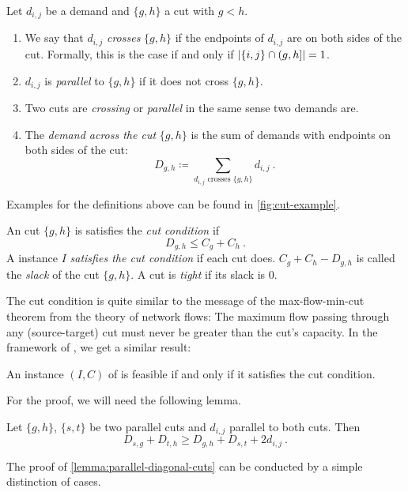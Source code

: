 \begin{definition}
	Let $d_{i, j}$ be a demand and $\{g, h\}$ a cut with $g < h$.
	\begin{enumerate}
		\item We say that $d_{i, j}$ \emph{crosses} $\{g, h\}$ if the endpoints of $d_{i, j}$ are on both sides of the cut.
		Formally, this is the case if and only if $\abs{\{i, j\} \cap (g, h]} = 1$.
		\item $d_{i, j}$ is \emph{parallel} to $\{g, h\}$ if it does not cross $\{g, h\}$.
		\item Two cuts are \emph{crossing} or \emph{parallel} in the same sense two demands are.
		\item The \emph{demand across the cut} $\{g, h\}$ is the sum of demands with endpoints on both sides of the cut:
		\begin{equation}
			\label{eq:cut-demand-definition}
			D_{g,h} \coloneqq \sum_{d_{i,j} \text{ crosses } \{g, h\} } d_{i, j}\ .
		\end{equation}
	\end{enumerate}
\end{definition}



Examples for the definitions above can be found in \cref{fig:cut-example}.

\begin{definition}
	An cut $\{g, h\}$ is satisfies the \emph{cut condition} if
	\begin{equation}
		D_{g,h} \leq C_g + C_h \ .
	\end{equation}
	A \RRLWC instance $I$ \emph{satisfies the cut condition} if each cut does.
	$C_g + C_h - D_{g,h}$ is called the \emph{slack} of the cut $\{g, h\}$.
	A cut is \emph{tight} if its slack is $0$.
\end{definition}

The cut condition is quite similar to the message of the max-flow-min-cut theorem from the theory of network flows:
The maximum flow passing through any (source-target) cut must never be greater than the cut's capacity.
In the framework of \RRLWC, we get a similar result:

\begin{theorem}
	\label{theo:cut-condition}
	An instance $(I, C)$ of \RRLWC is feasible if and only if it satisfies the cut condition.
\end{theorem}
For the proof, we will need the following lemma.
\begin{lemma}
	\label{lemma:parallel-diagonal-cuts}
	Let $\{g, h\}$, $\{s, t\}$ be two parallel cuts and $d_{i, j}$ parallel to both cuts.
	Then
	\begin{equation}
		D_{s,g} + D_{t,h} \geq D_{g,h} + D_{s,t} + 2 d_{i,j} \ .
	\end{equation}
\end{lemma}
The proof of \cref{lemma:parallel-diagonal-cuts} can be conducted by a simple distinction of cases.

